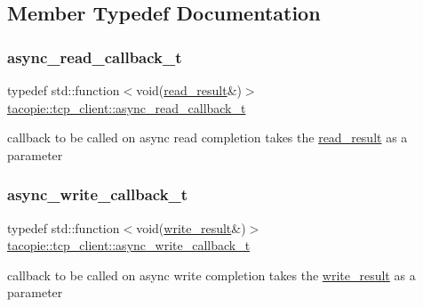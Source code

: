 \subsection{Member Typedef Documentation}
\mbox{\label{classtacopie_1_1tcp__client_acdf9dea8bac6c56f7b04ce38b9432322}} 
\subsubsection{\texorpdfstring{async\+\_\+read\+\_\+callback\+\_\+t}{async\_read\_callback\_t}}
{\footnotesize\ttfamily typedef std\+::function$<$void(\hyperlink{structtacopie_1_1tcp__client_1_1read__result}{read\+\_\+result}\&)$>$ \hyperlink{classtacopie_1_1tcp__client_acdf9dea8bac6c56f7b04ce38b9432322}{tacopie\+::tcp\+\_\+client\+::async\+\_\+read\+\_\+callback\+\_\+t}}

callback to be called on async read completion takes the \hyperlink{structtacopie_1_1tcp__client_1_1read__result}{read\+\_\+result} as a parameter \mbox{\label{classtacopie_1_1tcp__client_ad48b8c8dff8a77490eb2e3e802c82b97}} 
\subsubsection{\texorpdfstring{async\+\_\+write\+\_\+callback\+\_\+t}{async\_write\_callback\_t}}
{\footnotesize\ttfamily typedef std\+::function$<$void(\hyperlink{structtacopie_1_1tcp__client_1_1write__result}{write\+\_\+result}\&)$>$ \hyperlink{classtacopie_1_1tcp__client_ad48b8c8dff8a77490eb2e3e802c82b97}{tacopie\+::tcp\+\_\+client\+::async\+\_\+write\+\_\+callback\+\_\+t}}

callback to be called on async write completion takes the \hyperlink{structtacopie_1_1tcp__client_1_1write__result}{write\+\_\+result} as a parameter \mbox{\label{classtacopie_1_1tcp__client_aca5df52e5ee6fa673cf212532ada1453}} 
